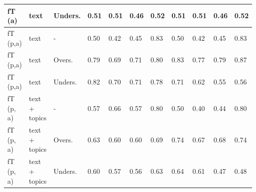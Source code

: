 \documentclass[ngerman]{ttlab-qualify}
\begin{document}
\begin{table}[!ht]
\begin{tabular}{|l|l|l|l|l|l|l|l|l|l|l|}
        fT  (a) & text  & Unders. & 0.51 & 0.51 & 0.46 & 0.52 & 0.51 & 0.51 & 0.46 & 0.52 \\ \hline
        fT (p,a) & text  &   - & 0.50 & 0.42 & 0.45 & 0.83 & 0.50 & 0.42 & 0.45 & 0.83 \\ \hline
        fT (p,a) & text  & Overs. & 0.79 & 0.69 & 0.71 & 0.80 & 0.83 & 0.77 & 0.79 & 0.87 \\ \hline
        fT (p,a) & text  & Unders. & 0.82 & 0.70 & 0.71 & 0.78 & 0.71 & 0.62 & 0.55 & 0.56 \\ \hline
        fT (p, a) & text + topics &  - & 0.57 & 0.66 & 0.57 & 0.80 & 0.50 & 0.40 & 0.44 & 0.80 \\ \hline
        fT (p, a) & text + topics & Overs. & 0.63 & 0.60 & 0.60 & 0.69 & 0.74 & 0.67 & 0.68 & 0.74 \\ \hline
        fT (p, a) & text + topics & Unders. & 0.60 & 0.57 & 0.56 & 0.63 & 0.64 & 0.61 & 0.47 & 0.48 \\ \hline
    \end{tabular}
\end{table}
\end{document}
